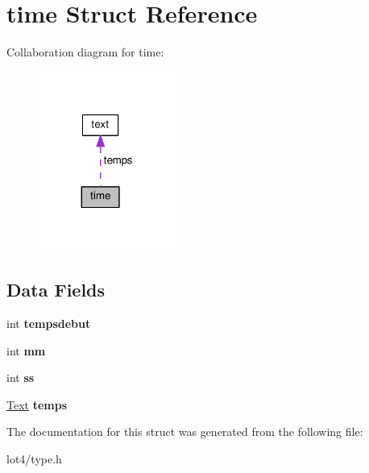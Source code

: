 \hypertarget{structtime}{}\section{time Struct Reference}
\label{structtime}


Collaboration diagram for time\+:
\nopagebreak
\begin{figure}[H]
\begin{center}
\leavevmode
\includegraphics[width=128pt]{structtime__coll__graph}
\end{center}
\end{figure}
\subsection*{Data Fields}
\begin{DoxyCompactItemize}
\item 
int {\bfseries tempsdebut}\hypertarget{structtime_a631b29da38929a12fb4997cb6c77ca65}{}\label{structtime_a631b29da38929a12fb4997cb6c77ca65}

\item 
int {\bfseries mm}\hypertarget{structtime_ae3e68d8be9d3f14dec119d67b848fc47}{}\label{structtime_ae3e68d8be9d3f14dec119d67b848fc47}

\item 
int {\bfseries ss}\hypertarget{structtime_a9d94f0d593508ac616752cbe36601004}{}\label{structtime_a9d94f0d593508ac616752cbe36601004}

\item 
\hyperlink{structtext}{Text} {\bfseries temps}\hypertarget{structtime_a664308034ded61bae3412c574ad3305c}{}\label{structtime_a664308034ded61bae3412c574ad3305c}

\end{DoxyCompactItemize}


The documentation for this struct was generated from the following file\+:\begin{DoxyCompactItemize}
\item 
lot4/type.\+h\end{DoxyCompactItemize}
